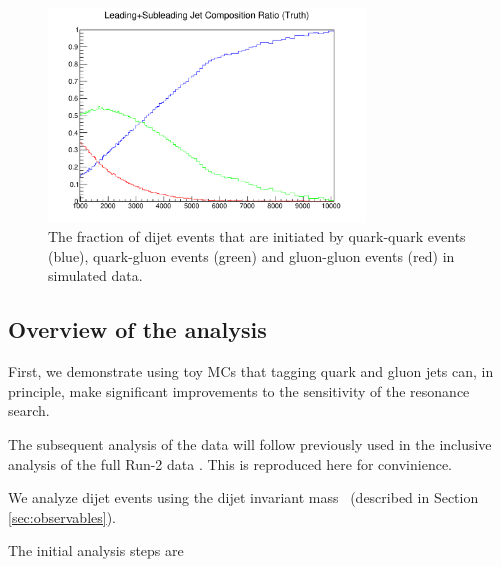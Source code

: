 \begin{figure}[htb]
 \centering
\includegraphics[width=0.75\textwidth]{figures/introduction/truthCompositionRatio.pdf}
\caption{The fraction of dijet events that are initiated by quark-quark events (blue), quark-gluon 
events (green) and gluon-gluon events (red) in simulated data.  \label{fig:quarkgluonfraction}}
\end{figure}

\subsection{Overview of the analysis}
\label{sec:overview}

First, we demonstrate using toy MCs that tagging quark and gluon jets can, in principle, make significant 
improvements to the sensitivity of the resonance search.

The subsequent analysis of the data will follow previously used in the inclusive analysis of the full Run-2 data 
\cite{EXOT-2016-21,Nishu:2646455}. This is reproduced here for convinience. 

We analyze dijet events using the dijet invariant mass \mjj\  (described in Section \ref{sec:observables}).

The initial analysis steps are

